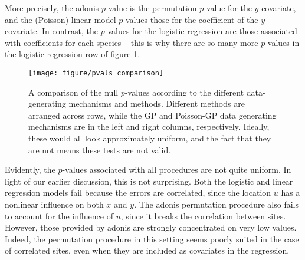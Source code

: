 \documentclass{article}
\begin{document}
More precisely, the adonis $p$-value is the permutation $p$-value for the $y$
covariate, and the (Poisson) linear model $p$-values those for the coefficient
of the $y$ covariate. In contrast, the $p$-values for the logistic regression
are those associated with coefficients for each species -- this is why there are
so many more $p$-values in the logistic regression row of figure
\ref{fig:pvals_comparison}.

\begin{figure}
  \centering
  \texttt{[image: figure/pvals\_comparison]}
  \caption{\label{fig:pvals_comparison} A comparison of the null $p$-values
    according to the different data-generating mechanisms and methods. Different
    methods are arranged across rows, while the GP and Poisson-GP data
    generating mechanisms are in the left and right columns, respectively.
    Ideally, these would all look approximately uniform, and the fact that they
    are not means these tests are not valid.}
\end{figure}

Evidently, the $p$-values associated with all procedures are not quite uniform.
In light of our earlier discussion, this is not surprising. Both the logistic
and linear regression models fail because the errors are correlated, since the
location $u$ has a nonlinear influence on both $x$ and $y$. The adonis
permutation procedure also fails to account for the influence of $u$, since it
breaks the correlation between sites. However, those provided by adonis are
strongly concentrated on very low values. Indeed, the permutation procedure in
this setting seems poorly suited in the case of correlated sites, even when they
are included as covariates in the regression.



\end{document}
